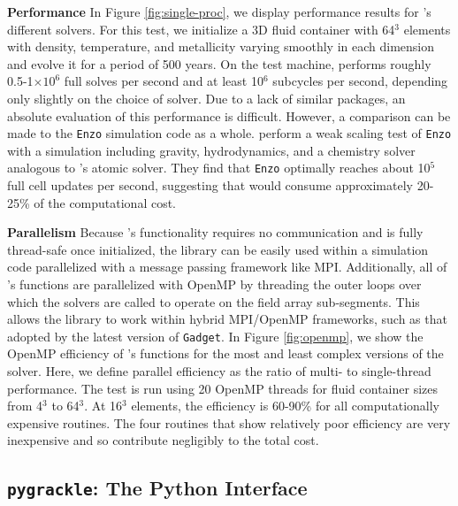 \noindent
{\bf Performance}
In Figure \ref{fig:single-proc}, we
display performance results for \grackle{}'s different solvers.  For
this test, we initialize a 3D fluid container with 64$^{3}$ elements
with density, temperature, and metallicity varying smoothly in each
dimension and evolve it for a period of 500 years.  On the test
machine, \grackle{} performs
roughly 0.5-1$\times10^{6}$ full solves per second and at least
10$^{6}$ subcycles per second, depending only slightly on the choice
of solver.  Due to a lack of similar packages, an absolute evaluation
of this performance is difficult.  However, a comparison can be made
to the \texttt{Enzo} simulation code as a whole.
\citet{2014ApJS..211...19B} perform a weak scaling test of
\texttt{Enzo} with a simulation including gravity,
hydrodynamics, and a chemistry solver analogous to \grackle{}'s atomic
solver.  They find that \texttt{Enzo} optimally reaches about 10$^{5}$
full cell updates per second, suggesting that \grackle{} would consume
approximately 20-25\% of the computational cost.

\noindent
{\bf Parallelism}
Because \grackle{}'s functionality requires no communication and is
fully thread-safe once initialized, the library can be easily used
within a simulation code parallelized with a message passing framework
like MPI.  Additionally, all of \grackle{}'s functions are
parallelized with OpenMP by threading the outer loops over which the
solvers are called to operate on the field array sub-segments.  This
allows the library to work within hybrid MPI/OpenMP frameworks, such
as that adopted by the latest version of \texttt{Gadget}.
In Figure \ref{fig:openmp}, we show the OpenMP efficiency of
\grackle{}'s functions for the most and least complex versions
of the solver.  Here, we define parallel efficiency as the ratio of
multi- to single-thread performance.  The test is run using 20 OpenMP
threads for fluid container sizes from 4$^{3}$ to
64$^{3}$.  At 16$^{3}$ elements, the efficiency is 60-90\%
for all computationally expensive routines.  The four routines that
show relatively poor efficiency are very inexpensive and so contribute negligibly to
the total cost.


\subsection{\texttt{pygrackle}: The Python Interface}

